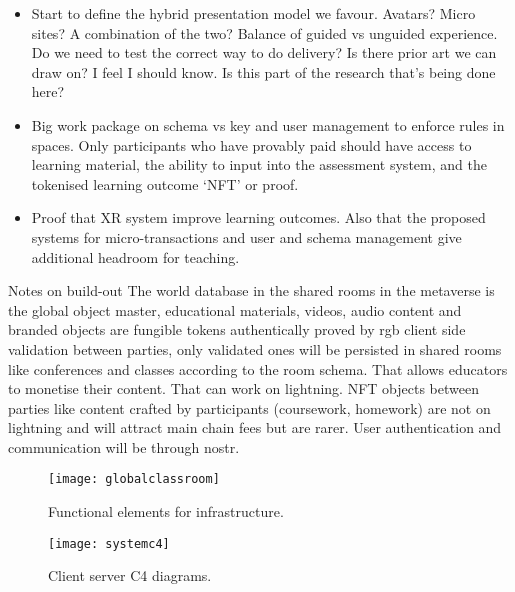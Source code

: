 \begin{itemize}
\item Start to define the hybrid presentation model we favour. Avatars? Micro sites? A combination of the two? Balance of guided vs unguided experience. Do we need to test the correct way to do delivery? Is there prior art we can draw on? I feel I should know. Is this part of the research that's being done here?
\item Big work package on schema vs key and user management to enforce rules in spaces. Only participants who have provably paid should have access to learning material, the ability to input into the assessment system, and the tokenised learning outcome `NFT' or proof.
\item Proof that XR system improve learning outcomes. Also that the proposed systems for micro-transactions and user and schema management give additional headroom for teaching.
\end{itemize}

Notes on build-out
The world database in the shared rooms in the metaverse is the global object master,  educational materials, videos,  audio content and branded objects are fungible tokens authentically proved by rgb client side validation between parties,  only validated ones will be persisted in shared rooms like conferences and classes according to the room schema. That allows educators to monetise their content.  That can work on lightning.  NFT objects between parties like content crafted by participants (coursework, homework) are not on lightning and will attract main chain fees but are rarer. User authentication and communication will be through nostr.

\begin{figure*}[ht]\centering %
	\texttt{[image: globalclassroom]}
	\caption{Functional elements for infrastructure.}
	\label{fig:globalclassroom}
\end{figure*}

\begin{figure*}[ht]\centering %
	\texttt{[image: systemc4]}
	\caption{Client server C4 diagrams.}
	\label{fig:globalclassroom}
\end{figure*}
